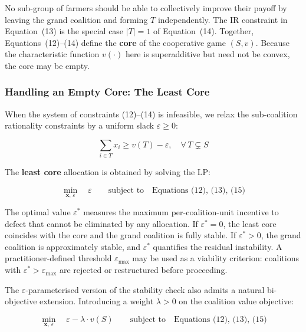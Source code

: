 \documentclass[manuscript, screen, review, anonymous]{acmart}
\begin{document}
No sub-group of farmers should be able to collectively improve their payoff by
leaving the grand coalition and forming $T$ independently. The IR constraint
in Equation~(13) is the special case $|T| = 1$ of Equation~(14). Together,
Equations~(12)--(14) define the \textbf{core} of the cooperative game
$(S, v)$. Because the characteristic function $v(\cdot)$ here is superadditive
but need not be convex, the core may be empty.

\subsubsection*{Handling an Empty Core: The Least Core}

When the system of constraints (12)--(14) is infeasible, we relax the
sub-coalition rationality constraints by a uniform slack $\varepsilon \geq 0$:

\begin{equation}
    \sum_{i \in T} x_i \geq v(T) - \varepsilon, \quad \forall\, T \subsetneq S
\end{equation}

The \textbf{least core} allocation is obtained by solving the LP:

\begin{equation}
    \min_{\mathbf{x},\, \varepsilon} \quad \varepsilon
    \qquad \text{subject to} \quad
    \text{Equations~(12), (13), (15)}
\end{equation}

The optimal value $\varepsilon^*$ measures the maximum per-coalition-unit
incentive to defect that cannot be eliminated by any allocation. If
$\varepsilon^* = 0$, the least core coincides with the core and the grand
coalition is fully stable. If $\varepsilon^* > 0$, the grand coalition is
approximately stable, and $\varepsilon^*$ quantifies the residual instability.
A practitioner-defined threshold $\varepsilon_{\max}$ may be used as a
viability criterion: coalitions with $\varepsilon^* > \varepsilon_{\max}$ are
rejected or restructured before proceeding.

The $\varepsilon$-parameterised version of the stability check also admits a
natural bi-objective extension. Introducing a weight $\lambda > 0$ on the
coalition value objective:

\begin{equation}
    \min_{\mathbf{x},\, \varepsilon} \quad \varepsilon - \lambda \cdot v(S)
    \qquad \text{subject to} \quad
    \text{Equations~(12), (13), (15)}
\end{equation}
\end{document}
